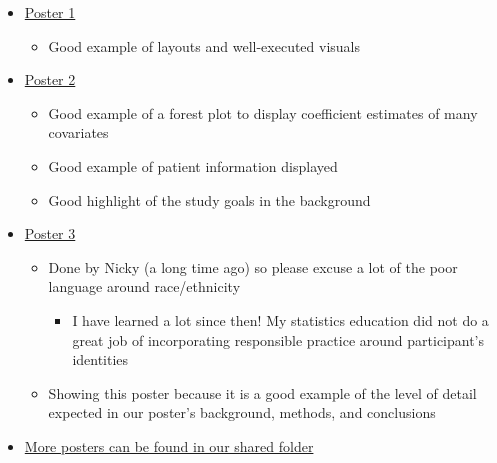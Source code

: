 \documentclass[
  letterpaper,
  DIV=11,
  numbers=noendperiod]{scrartcl}
\providecommand{\tightlist}{%
  \setlength{\itemsep}{0pt}\setlength{\parskip}{0pt}}
\begin{document}
\begin{itemize}
\tightlist
\item
  \href{https://ohsuitg-my.sharepoint.com/:b:/r/personal/wakim_ohsu_edu/Documents/Teaching/Classes/BSTA_513_26S/Student_files_BSTA_513/Project/Sample_poster/McVeety_Trans_Single_Payer_Poster.pdf?csf=1&web=1&e=L77P3h}{Poster
  1}

  \begin{itemize}
  \tightlist
  \item
    Good example of layouts and well-executed visuals
  \end{itemize}
\item
  \href{https://ohsuitg-my.sharepoint.com/:b:/r/personal/wakim_ohsu_edu/Documents/Teaching/Classes/BSTA_513_26S/Student_files_BSTA_513/Project/Sample_poster/Analysis\%20of\%20Veterans\%27\%20Non-disclosure\%20of\%20Suicidal\%20Thoughts.pdf?csf=1&web=1&e=MTVk2f}{Poster
  2}

  \begin{itemize}
  \tightlist
  \item
    Good example of a forest plot to display coefficient estimates of
    many covariates
  \item
    Good example of patient information displayed
  \item
    Good highlight of the study goals in the background
  \end{itemize}
\item
  \href{https://ohsuitg-my.sharepoint.com/:b:/r/personal/wakim_ohsu_edu/Documents/Teaching/Classes/BSTA_513_26S/Student_files_BSTA_513/Project/Sample_poster/nwakim_prop_score.pdf?csf=1&web=1&e=rN4Sry}{Poster
  3}

  \begin{itemize}
  \tightlist
  \item
    Done by Nicky (a long time ago) so please excuse a lot of the poor
    language around race/ethnicity

    \begin{itemize}
    \tightlist
    \item
      I have learned a lot since then! My statistics education did not
      do a great job of incorporating responsible practice around
      participant's identities
    \end{itemize}
  \item
    Showing this poster because it is a good example of the level of
    detail expected in our poster's background, methods, and conclusions
  \end{itemize}
\item
  \href{https://ohsuitg-my.sharepoint.com/:f:/r/personal/wakim_ohsu_edu/Documents/Teaching/Classes/BSTA_513_26S/Student_files_BSTA_513/Project/Sample_poster?csf=1&web=1&e=eBBVb4}{More
  posters can be found in our shared folder}
\end{itemize}
\end{document}

